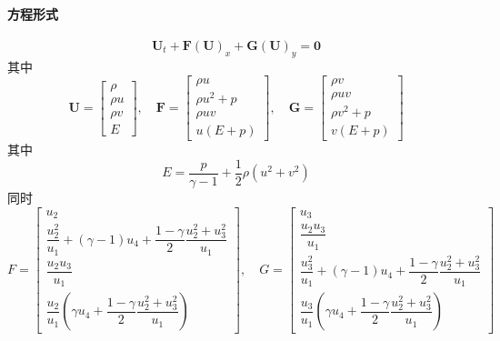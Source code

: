 \documentclass{book}
\begin{document}
\begin{example}
\begin{example}{}{}
\begin{example}
\begin{example}
\begin{example}
\begin{example}
\begin{example}{}{}
\paragraph{方程形式}
\begin{equation}
    \mathbf{U}_{t}+\mathbf{F}(\mathbf{U})_{x}+\mathbf{G}(\mathbf{U})_{y}=\mathbf{0}
\end{equation}
其中
\begin{equation}
    \mathbf{U}=\left[\begin{array}{c}
            \rho   \\
            \rho u \\
            \rho v \\
            E
        \end{array}\right], \quad \mathbf{F}=\left[\begin{array}{c}
            \rho u       \\
            \rho u^{2}+p \\
            \rho u v     \\
            u(E+p)
        \end{array}\right], \quad \mathbf{G}=\left[\begin{array}{c}
            \rho v       \\
            \rho u v     \\
            \rho v^{2}+p \\
            v(E+p)
        \end{array}\right]
\end{equation}
其中
\begin{equation}
    E=\dfrac{p}{\gamma-1}+\dfrac{1}{2} \rho\left(u^{2}+v^{2}\right)
\end{equation}
同时
\begin{equation}
    F = \begin{bmatrix}
        u_2                                                                          \\
        \dfrac{u_2^2}{u_1}+(\gamma-1)u_4+\dfrac{1-\gamma}{2}\dfrac{u_2^2+u_3^2}{u_1} \\
        \dfrac{u_2u_3}{u_1}                                                          \\
        \dfrac{u_2}{u_1}\left(\gamma u_4+\dfrac{1-\gamma}{2}\dfrac{u_2^2+u_3^2}{u_1}\right)
    \end{bmatrix}
    ,\quad G=\begin{bmatrix}
        u_3                                                                          \\
        \dfrac{u_2u_3}{u_1}                                                          \\
        \dfrac{u_3^2}{u_1}+(\gamma-1)u_4+\dfrac{1-\gamma}{2}\dfrac{u_2^2+u_3^2}{u_1} \\
        \dfrac{u_3}{u_1}\left(\gamma u_4+\dfrac{1-\gamma}{2}\dfrac{u_2^2+u_3^2}{u_1}\right)
    \end{bmatrix}
\end{equation}


\end{example}
\end{example}
\end{example}
\end{example}
\end{example}
\end{example}
\end{example}
\end{document}
